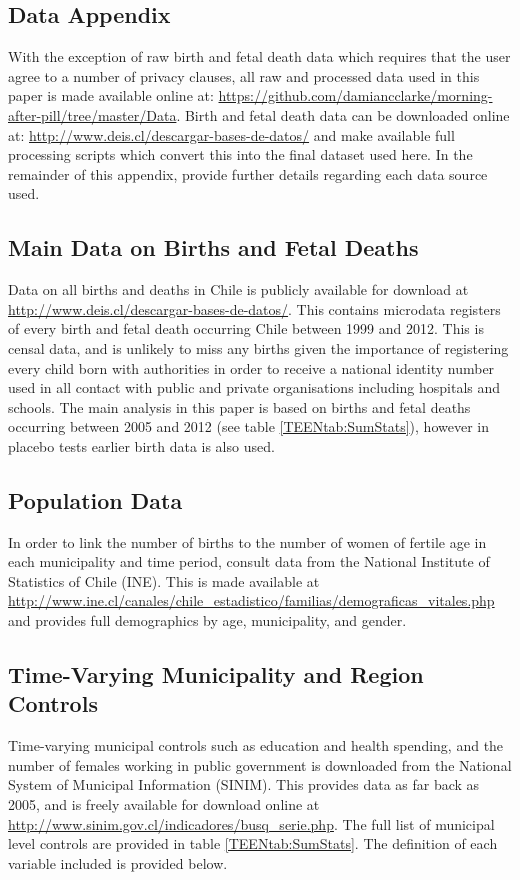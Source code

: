 \begin{spacing}{1.4}
\section{Data Appendix}
\label{Pscn:Data}
With the exception of raw birth and fetal death data which requires that the
user agree to a number of privacy clauses, all raw and processed data used in
this paper is made available online at: 
\url{https://github.com/damiancclarke/morning-after-pill/tree/master/Data}.
Birth and fetal death data can be downloaded online at: 
\url{http://www.deis.cl/descargar-bases-de-datos/} and \person make available 
full processing scripts which convert this into the final dataset used here.  In 
the remainder of this appendix, \person provide further details regarding each 
data source used.

\subsection{Main Data on Births and Fetal Deaths}
Data on all births and deaths in Chile is publicly available for download at
\url{http://www.deis.cl/descargar-bases-de-datos/}.  This contains microdata
registers of every birth and fetal death occurring Chile between 1999 and 2012.
This is censal data, and is unlikely to miss any births given the importance
of registering every child born with authorities in order to receive a national
identity number used in all contact with public and private organisations 
including hospitals and schools.  The main analysis in this paper is based on
births and fetal deaths occurring between 2005 and 2012 (see table 
\ref{TEENtab:SumStats}), however in placebo tests earlier birth data is also
used.

\subsection{Population Data}
In order to link the number of births to the number of women of fertile age in
each municipality and time period, \person consult data from the National 
Institute of Statistics of Chile (INE).  This is made available at 
\url{http://www.ine.cl/canales/chile_estadistico/familias/demograficas_vitales.php}
and provides full demographics by age, municipality, and gender.

\subsection{Time-Varying Municipality and Region Controls}
Time-varying municipal controls such as education and health spending, and the
number of females working in public government is downloaded from the National
System of Municipal Information (SINIM).  This provides data as far back as
2005, and is freely available for download online at
\url{http://www.sinim.gov.cl/indicadores/busq_serie.php}.  The full list of
municipal level controls are provided in table \ref{TEENtab:SumStats}.  The
definition of each variable included is provided below.
\vspace{1mm} \\


\end{spacing}
